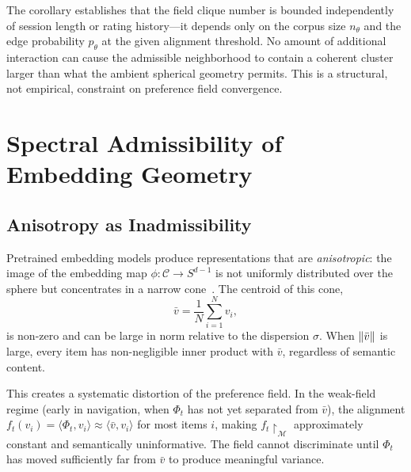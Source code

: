 \documentclass[12pt, a4paper]{article}
\DeclarePairedDelimiter{\norm}{\lVert}{\rVert}
\theoremstyle{plain}
\theoremstyle{definition}
\begin{document}
The corollary establishes that the field clique number is bounded
independently of session length or rating history---it depends only on
the corpus size $n_\theta$ and the edge probability $p_\theta$ at the given
alignment threshold. No amount of additional interaction can cause the
admissible neighborhood to contain a coherent cluster larger than what the
ambient spherical geometry permits. This is a structural, not empirical,
constraint on preference field convergence.

\section{Spectral Admissibility of Embedding Geometry}
\label{sec:spectral}

\subsection{Anisotropy as Inadmissibility}

Pretrained embedding models produce representations that are
\textit{anisotropic}: the image of the embedding map $\phi : \mathcal{C} \to
S^{d-1}$ is not uniformly distributed over the sphere but concentrates in a
narrow cone~\cite{ethayarajh2019anisotropy}. The centroid of this cone,
\begin{equation}
  \bar{v} = \frac{1}{N}\sum_{i=1}^N v_i,
\end{equation}
is non-zero and can be large in norm relative to the dispersion $\sigma$.
When $\norm{\bar{v}}$ is large, every item has non-negligible inner product
with $\bar{v}$, regardless of semantic content.

This creates a systematic distortion of the preference field. In the
weak-field regime (early in navigation, when $\Phi_t$ has not yet separated
from $\bar{v}$), the alignment $f_t(v_i) = \langle \Phi_t, v_i \rangle
\approx \langle \bar{v}, v_i \rangle$ for most items $i$, making
$f_t\!\restriction_\mathcal{M}$ approximately constant and semantically
uninformative. The field cannot discriminate until $\Phi_t$ has moved
sufficiently far from $\bar{v}$ to produce meaningful variance.
\end{document}
